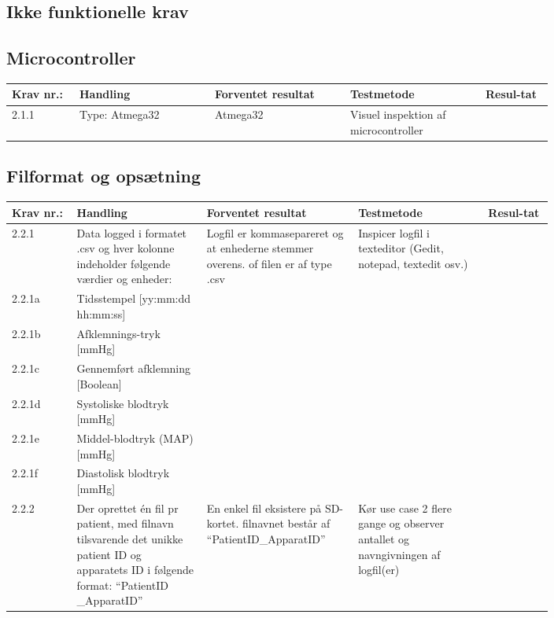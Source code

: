 \documentclass[12pt, a4paper]{memoir}
\begin{document}
\begin{landscape}
	\section{Ikke funktionelle krav}
			\subsection{Microcontroller}
				\begin{longtable}{|p{0.1\linewidth}|p{0.2\linewidth}|p{0.2\linewidth}|p{0.2\linewidth}|p{0.1\linewidth}|}
					\hline
					Krav nr.: & Handling & Forventet resultat & Testmetode & Resul-tat  \\\hline
					 2.1.1 & Type: Atmega32 & Atmega32 & Visuel inspektion af microcontroller & \\ \hline
				\end{longtable}
			
			\pagebreak
			\subsection{Filformat og opsætning}
				\begin{longtable}{|p{0.1\linewidth}|p{0.2\linewidth}|p{0.2\linewidth}|p{0.2\linewidth}|p{0.1\linewidth}|}
					\hline
					Krav nr.: & Handling & Forventet resultat & Testmetode & Resul-tat  \\\hline
					2.2.1 & Data logged i formatet .csv og hver kolonne indeholder følgende værdier og enheder:  & \multirow{7}{\linewidth}{Logfil er kommasepareret og at enhederne stemmer overens. of filen er af type .csv }&  \multirow{7}{\linewidth}{Inspicer logfil i texteditor (Gedit, notepad, textedit osv.)}& \multirow{7}{\linewidth}{} \\ \cline{1-2}
					2.2.1a& Tidsstempel [yy:mm:dd hh:mm:ss] & &  & \\ \cline{1-2}
					2.2.1b& Afklemnings-tryk [mmHg] & &  & \\ \cline{1-2}
					2.2.1c&  Gennemført afklemning [Boolean] & &  & \\ \cline{1-2}
					2.2.1d&  Systoliske blodtryk [mmHg] & &  & \\ \cline{1-2}
					2.2.1e&  Middel-blodtryk (MAP) [mmHg] & &  & \\ \cline{1-2}
					2.2.1f&  Diastolisk blodtryk [mmHg]  & &  & \\ \hline
					2.2.2 & Der oprettet én fil pr patient, med filnavn tilsvarende det unikke patient ID og apparatets ID i følgende format: “PatientID \_ApparatID”  & En enkel fil eksistere på SD-kortet. filnavnet består af “PatientID\_ApparatID” & Kør use case 2 flere gange og observer antallet og navngivningen af logfil(er)  & \\ \hline
				\end{longtable}
			

\end{landscape}
\end{document}
